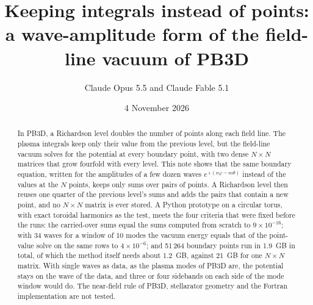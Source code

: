 \documentclass[%
 aip,
 rsi,%
 amsmath,amssymb,
 reprint,%
]{revtex4-1}
\begin{document}
\let\oldhat\hat
\renewcommand{\vec}[1]{\bm{#1}}
\renewcommand{\hat}[1]{\oldhat{\bm{#1}}}
\newcommand{\mtx}[1]{\underline{\mathrm{#1}}}

\renewcommand{\d}[1]{\ensuremath{\operatorname{d}\!{#1}}}

\newcommand{\J}{\mathcal{J}}

\newcommand{\pvint}{\fint}

\renewcommand{\dbltopfraction}{0.9}
\renewcommand{\topfraction}{0.9}
\raggedbottom

\title[Exploration note, PB3D issue \#4 --- Keeping integrals instead of points in the field-line vacuum]{Keeping integrals instead of points: a wave-amplitude form of the field-line vacuum of PB3D}

\author{Claude Opus 5.5 and Claude Fable 5.1}

\date{4 November 2026}

\begin{abstract}
In PB3D, a Richardson level doubles the number of points along each field line.
The plasma integrals keep only their value from the previous level, but the field-line vacuum solves for the potential at every boundary point, with two dense $N\times N$ matrices that grow fourfold with every level.
This note shows that the same boundary equation, written for the amplitudes of a few dozen waves $e^{\imath(n\varphi - m\theta)}$ instead of the values at the $N$ points, keeps only sums over pairs of points.
A Richardson level then reuses one quarter of the previous level's sums and adds the pairs that contain a new point, and no $N\times N$ matrix is ever stored.
A Python prototype on a circular torus, with exact toroidal harmonics as the test, meets the four criteria that were fixed before the runs: the carried-over sums equal the sums computed from scratch to $9\times10^{-16}$; with 34 waves for a window of 10 modes the vacuum energy equals that of the point-value solve on the same rows to $4\times10^{-6}$; and 51\,264 boundary points run in 1.9~GB in total, of which the method itself needs about 1.2~GB, against 21~GB for one $N\times N$ matrix.
With single waves as data, as the plasma modes of PB3D are, the potential stays on the wave of the data, and three or four sidebands on each side of the mode window would do.
The near-field rule of PB3D, stellarator geometry and the Fortran implementation are not tested.
\end{abstract}
\end{document}
